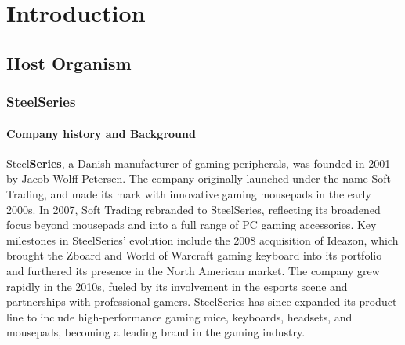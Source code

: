 \chapter{Introduction}

\section{Host Organism}
\subsection{SteelSeries}
\subsubsection{Company history and Background}
Steel\textbf{Series}, a Danish manufacturer of gaming peripherals, was founded in 2001 by Jacob Wolff-Petersen. The company originally launched under the name Soft Trading, and made its mark with innovative gaming mousepads in the early 2000s. In 2007, Soft Trading rebranded to SteelSeries, reflecting its broadened focus beyond mousepads and into a full range of PC gaming accessories. Key milestones in SteelSeries' evolution include the 2008 acquisition of Ideazon, which brought the Zboard and World of Warcraft gaming keyboard into its portfolio and furthered its presence in the North American market.
The company grew rapidly in the 2010s, fueled by its involvement in the esports scene and partnerships with professional gamers. SteelSeries has since expanded its product line to include high-performance gaming mice, keyboards, headsets, and mousepads, becoming a leading brand in the gaming industry.

